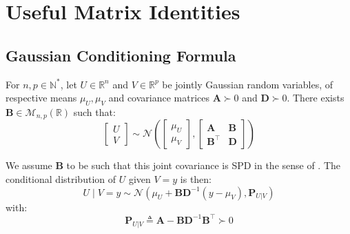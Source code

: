 \chapter{Useful Matrix Identities}

\vfill
\localtableofcontents
\vfill
\newpage

\section{Gaussian Conditioning Formula}

\begin{proposition}\label{th:Gaussian_conditioning}
	For $n,p\in\mathbb{N}^*$, let $U\in\mathbb{R}^n$ and $V\in\mathbb{R}^p$ be jointly Gaussian random variables, of respective means $\mu_U,\mu_V$ and covariance matrices $\mathbf{A}\succ0$ and $\mathbf{D}\succ0$. There exists $\mathbf{B}\in\mathcal{M}_{n,p}(\mathbb{R})$ such that:
	\begin{equation}
		\begin{bmatrix}U\\V\end{bmatrix}\sim\mathcal{N}\left(\begin{bmatrix}\mu_U\\\mu_V\end{bmatrix},\begin{bmatrix}\mathbf{A}&\mathbf{B}\\\mathbf{B}^\top&\mathbf{D}\end{bmatrix}\right)
	\end{equation}

	We assume $\mathbf{B}$ to be such that this joint covariance is SPD in the sense of . The conditional distribution of $U$ given $V=y$ is then:
	\begin{equation}
		U\mid V=y\sim\mathcal{N}\left(\mu_U+\mathbf{B}\mathbf{D}^{-1}(y-\mu_V),\mathbf{P}_{U|V}\right)
	\end{equation}
	with:
	\begin{equation}
		\mathbf{P}_{U|V}\triangleq \mathbf{A}-\mathbf{B}\mathbf{D}^{-1}\mathbf{B}^\top\succ0
	\end{equation}
\end{proposition}

